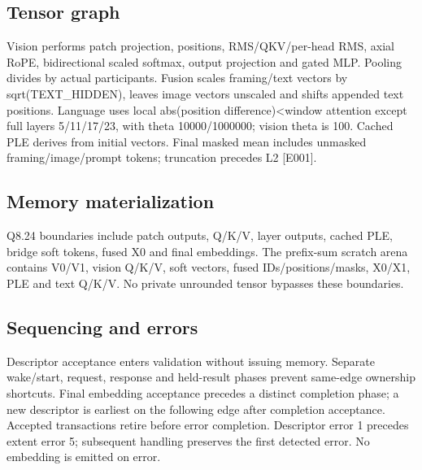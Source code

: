 \documentclass[11pt,a4paper]{article}
\begin{document}
\subsection{Tensor graph}

Vision performs patch projection,\allowbreak{} positions,\allowbreak{} RMS/\allowbreak{}QKV/\allowbreak{}per-head RMS,\allowbreak{} axial RoPE,\allowbreak{} bidirectional scaled softmax,\allowbreak{} output projection and gated MLP. Pooling divides by actual participants. Fusion scales framing/\allowbreak{}text vectors by sqrt(\allowbreak{}TEXT\_\allowbreak{}HIDDEN)\allowbreak{},\allowbreak{} leaves image vectors unscaled and shifts appended text positions. Language uses local abs(\allowbreak{}position difference)\allowbreak{}<window attention except full layers 5/\allowbreak{}11/\allowbreak{}17/\allowbreak{}23,\allowbreak{} with theta 10000/\allowbreak{}1000000; vision theta is 100. Cached PLE derives from initial vectors. Final masked mean includes unmasked framing/\allowbreak{}image/\allowbreak{}prompt tokens; truncation precedes L2 [\allowbreak{}E001]\allowbreak{}.

\subsection{Memory materialization}

Q8.24 boundaries include patch outputs,\allowbreak{} Q/\allowbreak{}K/\allowbreak{}V,\allowbreak{} layer outputs,\allowbreak{} cached PLE,\allowbreak{} bridge soft tokens,\allowbreak{} fused X0 and final embeddings. The prefix-sum scratch arena contains V0/\allowbreak{}V1,\allowbreak{} vision Q/\allowbreak{}K/\allowbreak{}V,\allowbreak{} soft vectors,\allowbreak{} fused IDs/\allowbreak{}positions/\allowbreak{}masks,\allowbreak{} X0/\allowbreak{}X1,\allowbreak{} PLE and text Q/\allowbreak{}K/\allowbreak{}V. No private unrounded tensor bypasses these boundaries.

\subsection{Sequencing and errors}

Descriptor acceptance enters validation without issuing memory. Separate wake/\allowbreak{}start,\allowbreak{} request,\allowbreak{} response and held-result phases prevent same-edge ownership shortcuts. Final embedding acceptance precedes a distinct completion phase; a new descriptor is earliest on the following edge after completion acceptance. Accepted transactions retire before error completion. Descriptor error 1 precedes extent error 5; subsequent handling preserves the first detected error. No embedding is emitted on error.
\end{document}
